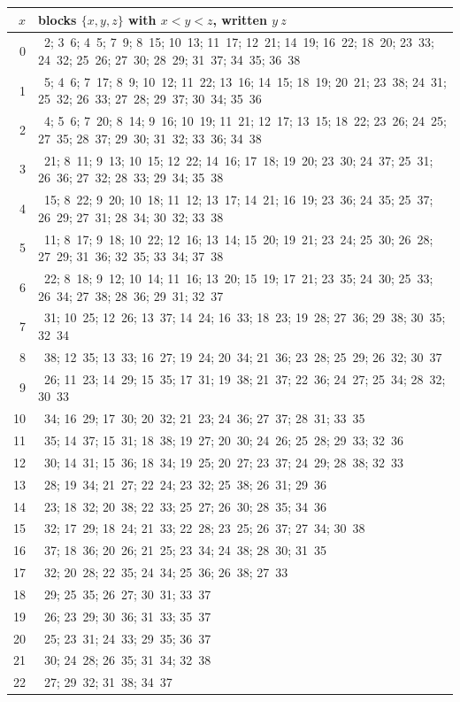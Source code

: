 \documentclass[11pt]{article}
\theoremstyle{definition}
\begin{document}
\begin{appendices}
{\small
\noindent
\begin{tabularx}{\textwidth}{@{}r>{\raggedright\arraybackslash}X@{}}
\toprule
$x$ & blocks $\{x,y,z\}$ with $x<y<z$, written $y~z$\\
\midrule
0 & 1~2; 3~6; 4~5; 7~9; 8~15; 10~13; 11~17; 12~21; 14~19; 16~22; 18~20; 23~33; 24~32; 25~26; 27~30; 28~29; 31~37; 34~35; 36~38 \\
1 & 3~5; 4~6; 7~17; 8~9; 10~12; 11~22; 13~16; 14~15; 18~19; 20~21; 23~38; 24~31; 25~32; 26~33; 27~28; 29~37; 30~34; 35~36 \\
2 & 3~4; 5~6; 7~20; 8~14; 9~16; 10~19; 11~21; 12~17; 13~15; 18~22; 23~26; 24~25; 27~35; 28~37; 29~30; 31~32; 33~36; 34~38 \\
3 & 7~21; 8~11; 9~13; 10~15; 12~22; 14~16; 17~18; 19~20; 23~30; 24~37; 25~31; 26~36; 27~32; 28~33; 29~34; 35~38 \\
4 & 7~15; 8~22; 9~20; 10~18; 11~12; 13~17; 14~21; 16~19; 23~36; 24~35; 25~37; 26~29; 27~31; 28~34; 30~32; 33~38 \\
5 & 7~11; 8~17; 9~18; 10~22; 12~16; 13~14; 15~20; 19~21; 23~24; 25~30; 26~28; 27~29; 31~36; 32~35; 33~34; 37~38 \\
6 & 7~22; 8~18; 9~12; 10~14; 11~16; 13~20; 15~19; 17~21; 23~35; 24~30; 25~33; 26~34; 27~38; 28~36; 29~31; 32~37 \\
7 & 8~31; 10~25; 12~26; 13~37; 14~24; 16~33; 18~23; 19~28; 27~36; 29~38; 30~35; 32~34 \\
8 & 10~38; 12~35; 13~33; 16~27; 19~24; 20~34; 21~36; 23~28; 25~29; 26~32; 30~37 \\
9 & 10~26; 11~23; 14~29; 15~35; 17~31; 19~38; 21~37; 22~36; 24~27; 25~34; 28~32; 30~33 \\
10 & 11~34; 16~29; 17~30; 20~32; 21~23; 24~36; 27~37; 28~31; 33~35 \\
11 & 13~35; 14~37; 15~31; 18~38; 19~27; 20~30; 24~26; 25~28; 29~33; 32~36 \\
12 & 13~30; 14~31; 15~36; 18~34; 19~25; 20~27; 23~37; 24~29; 28~38; 32~33 \\
13 & 18~28; 19~34; 21~27; 22~24; 23~32; 25~38; 26~31; 29~36 \\
14 & 17~23; 18~32; 20~38; 22~33; 25~27; 26~30; 28~35; 34~36 \\
15 & 16~32; 17~29; 18~24; 21~33; 22~28; 23~25; 26~37; 27~34; 30~38 \\
16 & 17~37; 18~36; 20~26; 21~25; 23~34; 24~38; 28~30; 31~35 \\
17 & 19~32; 20~28; 22~35; 24~34; 25~36; 26~38; 27~33 \\
18 & 21~29; 25~35; 26~27; 30~31; 33~37 \\
19 & 22~26; 23~29; 30~36; 31~33; 35~37 \\
20 & 22~25; 23~31; 24~33; 29~35; 36~37 \\
21 & 22~30; 24~28; 26~35; 31~34; 32~38 \\
22 & 23~27; 29~32; 31~38; 34~37 \\
\bottomrule
\end{tabularx}
}


\end{appendices}
\end{document}
